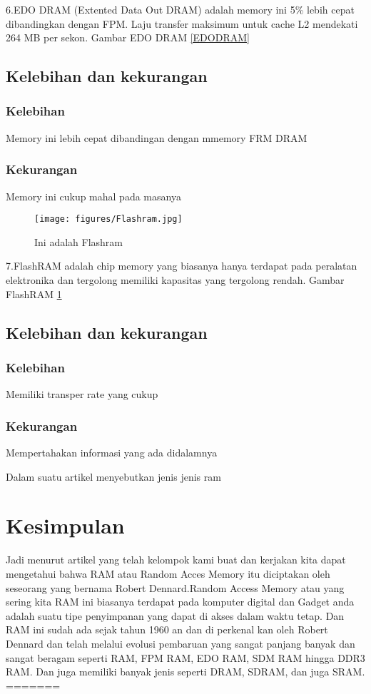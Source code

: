 6.EDO DRAM (Extented Data Out DRAM) adalah memory ini 5\% lebih cepat dibandingkan dengan FPM. Laju transfer maksimum untuk cache L2 mendekati 264 MB per sekon.
Gambar EDO DRAM \ref{EDODRAM}
  \subsection{Kelebihan dan kekurangan}
    \subsubsection{Kelebihan}
    \-Memory ini lebih cepat dibandingan dengan mmemory FRM DRAM
    \subsubsection{Kekurangan}
    \-Memory ini cukup mahal pada masanya


  \begin{figure}[ht]
  \centerline{\texttt{[image: figures/Flashram.jpg]}}
  \caption{Ini adalah Flashram}
  \label{Flashram}
  \end{figure}

7.FlashRAM adalah chip memory yang biasanya hanya terdapat pada peralatan elektronika dan tergolong memiliki kapasitas yang tergolong rendah.
Gambar FlashRAM \ref{Flashram}
  \subsection{Kelebihan dan kekurangan}
    \subsubsection{Kelebihan}
    \-Memiliki transper rate yang cukup
    \subsubsection{Kekurangan}
    \-Mempertahakan informasi yang ada didalamnya

Dalam suatu artikel menyebutkan jenis \- jenis ram \cite{bruce1999unified}

\section{Kesimpulan}
Jadi menurut artikel yang telah kelompok kami buat dan kerjakan kita dapat mengetahui bahwa RAM atau Random Acces Memory itu diciptakan oleh seseorang yang bernama Robert Dennard.Random Access Memory atau yang sering kita RAM ini biasanya terdapat pada komputer digital dan Gadget anda adalah suatu tipe penyimpanan yang dapat di akses dalam waktu tetap. Dan RAM ini sudah ada sejak tahun 1960 an dan di perkenal kan oleh Robert Dennard dan telah melalui evolusi pembaruan yang sangat panjang banyak dan sangat beragam seperti RAM, FPM RAM, EDO RAM, SDM RAM hingga DDR3 RAM. Dan juga memiliki banyak jenis seperti DRAM, SDRAM, dan juga SRAM.
=======
﻿%





